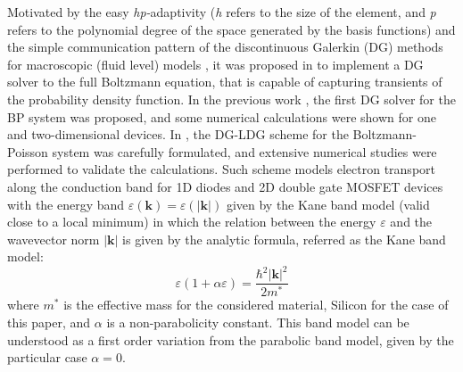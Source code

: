 \documentclass[11pt]{article}
\newcommand{\bk}{\mathbf{k}}
\newcommand{\eps}{\varepsilon}
\newcommand{\enk}{\eps(\bk)}
\begin{document}
Motivated by the easy {\it hp-}adaptivity ({\it h} refers to the size of the element, and {\it p} refers to the polynomial degree of the space generated by the basis functions) and the simple communication pattern of 
the discontinuous Galerkin (DG) methods for macroscopic (fluid level) models \cite{Chen_95_JCP_Q, 
Chen_95_VLSI, LS1,LS2}, it was proposed in \cite{chgms-sispad07, Cheng_08_JCE_BP} to implement a DG 
solver to the full Boltzmann equation, that is capable of capturing transients of the probability 
density function. 
In the previous work \cite{chgms-sispad07,Cheng_08_JCE_BP}, the first DG solver for the BP system
was proposed, and some numerical calculations were shown for one and 
two-dimensional devices.  In \cite{CGMS-CMAME2008}, the DG-LDG scheme for the Boltzmann-Poisson 
system was carefully formulated, and extensive numerical studies were performed to validate the 
calculations. Such scheme 
models electron transport along the conduction band for 1D diodes and 2D double gate MOSFET devices 
with the energy band $\enk = \varepsilon( | \bk | )$ given by the Kane band model (valid close to a 
local minimum) in which the relation between the energy $\varepsilon$ and the wavevector norm $| \bk 
|$ is given by the analytic formula, referred as the Kane band model: 
%
\begin{equation}
\label{kaneband}
\varepsilon \left( 1 + \alpha \varepsilon \right) = \frac{ \hbar^2 |\bk|^2 }{2m^*} 
\end{equation}
%
where $m^*$ is the effective mass for the considered material, Silicon for the case of this paper, 
and $\alpha$ is a non-parabolicity constant. This band model can be understood as a first order 
variation from the parabolic band model, given by the particular case
$\alpha = 0 $. 
\end{document}
